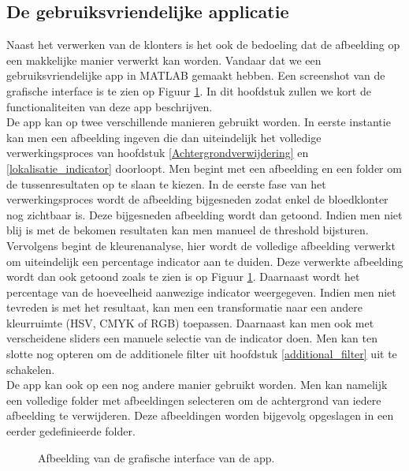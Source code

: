 \documentclass[a4paper,kulak]{kulakarticle}
\begin{document}
\subsection{De gebruiksvriendelijke applicatie}
Naast het verwerken van de klonters is het ook de bedoeling dat de afbeelding op een makkelijke manier verwerkt kan worden. Vandaar dat we een gebruiksvriendelijke app in MATLAB gemaakt hebben.
Een screenshot van de grafische interface is te zien op Figuur \ref{figuur interface}. In dit hoofdstuk zullen we kort de functionaliteiten van deze app beschrijven.\\
De app kan op twee verschillende manieren gebruikt worden. In eerste instantie kan men een afbeelding ingeven die dan uiteindelijk het volledige verwerkingsproces van hoofdstuk \ref{Achtergrondverwijdering} en \ref{lokalisatie_indicator} doorloopt. Men begint met een afbeelding en een folder om de tussenresultaten op te slaan te kiezen. In de eerste fase van het verwerkingsproces wordt de afbeelding bijgesneden zodat enkel de bloedklonter nog zichtbaar is. Deze bijgesneden afbeelding wordt dan getoond. Indien men niet blij is met de bekomen resultaten kan men manueel de threshold bijsturen. Vervolgens begint de kleurenanalyse, hier wordt de volledige afbeelding verwerkt om uiteindelijk een percentage indicator aan te duiden. Deze verwerkte afbeelding wordt dan ook getoond zoals te zien is op Figuur \ref{figuur interface}. Daarnaast wordt het percentage van de hoeveelheid aanwezige indicator weergegeven. Indien men niet tevreden is met het resultaat, kan men een transformatie naar een andere kleurruimte (HSV, CMYK of RGB) toepassen. Daarnaast kan men ook met verscheidene sliders een manuele selectie van de indicator doen. Men kan ten slotte nog opteren om de additionele filter uit hoofdstuk \ref{additional_filter} uit te schakelen. \\
De app kan ook op een nog andere manier gebruikt worden. Men kan namelijk een volledige folder met afbeeldingen selecteren om de achtergrond van iedere afbeelding te verwijderen. Deze afbeeldingen worden bijgevolg opgeslagen in een eerder gedefinieerde folder.

\begin{figure}[H]
	\centering
	
	\caption{Afbeelding van de grafische interface van de app.}
	\label{figuur interface}
\end{figure}
\end{document}
